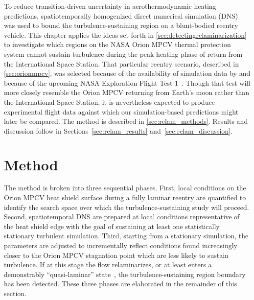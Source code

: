 \label{sec:relam}

To reduce transition-driven uncertainty in aerothermodynamic heating
predictions, spatiotemporally homogenized direct numerical simulation
(DNS) was used to bound the turbulence-sustaining region on a blunt-bodied reentry
vehicle.  This chapter applies the ideas set forth in
\autoref{sec:detectingrelaminarization} to investigate which regions on the NASA
Orion MPCV thermal protection system cannot sustain turbulence during the peak
heating phase of return from the International Space Station.
%
That particular reentry scenario, described in \autoref{sec:orionmpcv},
was selected because of the availability of simulation data by
\citeauthor{Bauman2011Loose} and because of the upcoming NASA Exploration Flight
Test-1~\citep{SpaceCom20140317}.  Though that test will more closely resemble
the Orion MPCV returning from Earth's moon rather than the International Space
Station, it is nevertheless expected to produce experimental flight data against
which our simulation-based predictions might later be compared.
%
The method is described in \autoref{sec:relam_methods}.  Results and discussion
follow in Sections~\ref{sec:relam_results} and~\ref{sec:relam_discussion}.


\section{Method}
\label{sec:relam_methods}

The method is broken into three sequential phases.
%
First, local conditions on the Orion MPCV heat shield surface during a fully
laminar reentry are quantified to identify the search space over which the
turbulence-sustaining study will proceed.
%
Second, spatiotemporal DNS are prepared at local conditions representative of
the heat shield edge with the goal of sustaining at least one statistically
stationary turbulent simulation.
%
Third, starting from a stationary simulation, the parameters are
adjusted to incrementally reflect conditions found increasingly closer to the
Orion MPCV stagnation point which are less likely to sustain turbulence.
%
If at this stage the flow relaminarizes, or at least enters a demonstrably
``quasi-laminar'' state~\citep{Sreenivasan1982Laminarescent}, the
turbulence-sustaining region boundary has been detected.
%
These three phases are elaborated in the remainder of this section.


